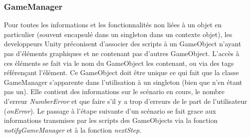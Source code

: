 \subsubsection{GameManager}
Pour toutes les informations et les fonctionnalités non liées à un objet en particulier (souvent encapsulé dans un singleton dans un contexte objet), les developpeurs Unity préconisent d'associer des scripts à un GameObject n'ayant pas d'éléments graphiques et ne contenant pas d'autres GameObject.
L'accès à ces éléments se fait via le nom du GameObject les contenant, ou via des tags référençant l'élément. Ce GameObject doit être unique ce qui fait que la classe GameManager s'apparente dans l'utilisation à un singleton (bien que n'en étant pas un). 
Elle contient des informations sur le scénario en cours, le nombre d'erreur \textit{NumberError} et que faire s'il y a trop d'erreurs de le part de l'utilisateur (\textit{onError}).
Le passage à l'étape suivante d'un scénario se fait grace aux informations transmises par les scripts des GameObjects via la fonction \textit{notifyGameManager} et à la fonction \textit{nextStep}.
